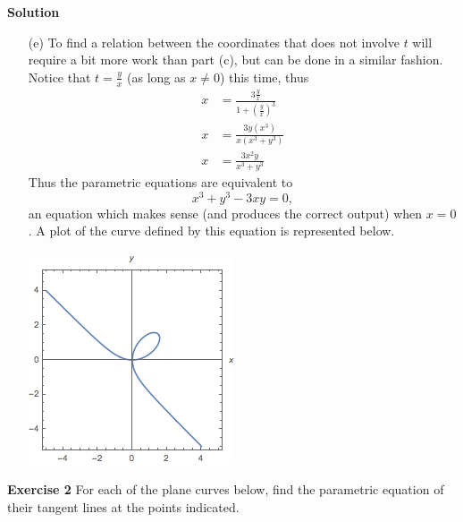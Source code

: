 \documentclass[12pt,oneside]{exam}
\newenvironment{exercise}[1]{\vspace{.1in}\noindent\textbf{Exercise #1 \hspace{.05em}}}{}
\newenvironment{newsolution}{\vspace{.1in}\noindent\textbf{Solution \hspace{.05em}}}{}
\begin{document}
\begin{newsolution}
\begin{itemize}
\begin{center}
\end{center}
\item[(e)] To find a relation between the coordinates that does not involve $t$ will require a bit more work than part (c), but can be done in a similar fashion. Notice that $t=\frac{y}{x}$ (as long as $x\neq 0$) this time, thus
\begin{align*}
x & = \frac{3\frac{y}{x}}{1+\left( \frac{y}{x}\right)^3}\\
x & = \frac{3y(x^3)}{x(x^3+y^3)}\\
x & = \frac{3x^2y}{x^3+y^3}
\end{align*}
Thus the parametric equations are equivalent to 
\begin{equation*}
x^3+y^3-3xy=0,
\end{equation*}
an equation which makes sense (and produces the correct output) when $x=0$. A plot of the curve defined by this equation is represented below. 
\begin{center}
\includegraphics{hw2_plot1e.png}
\end{center}
\end{itemize} 
\end{newsolution}

\begin{exercise}{2} 
For each of the plane curves below, find the parametric equation of their tangent lines at the points indicated. 
\end{exercise}
\end{document}
